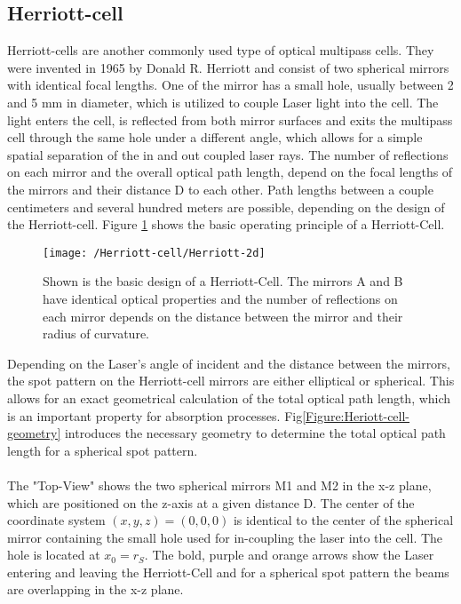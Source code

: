 \subsection{Herriott-cell}
Herriott-cells are another commonly used type of optical multipass cells. They were invented in 1965 by Donald R. Herriott and consist of two spherical mirrors with identical focal lengths. One of the mirror has a small hole, usually between 2 and 5 mm in diameter, which is utilized to couple Laser light into the cell. The light enters the cell, is reflected from both mirror surfaces and exits the multipass cell through the same hole under a different angle, which allows for a simple spatial separation of the in and out coupled laser rays. The number of reflections on each mirror and the overall optical path length, depend on the focal lengths of the mirrors and their distance D to each other. Path lengths between a couple centimeters and several hundred meters are possible, depending on the design of the Herriott-cell. Figure \ref{Figure:Heriott-cell} shows the basic operating principle of a Herriott-Cell.
\begin{figure}[H]
	\centering
		\centering
		\texttt{[image: /Herriott-cell/Herriott-2d]}
		\caption{Shown is the basic design of a Herriott-Cell. The mirrors A and B have identical optical properties and the number of reflections on each mirror depends on the distance between the mirror and their radius of curvature.}
	\label{Figure:Heriott-cell}
\end{figure}
\noindent
Depending on the Laser's angle of incident and the distance between the mirrors, the spot pattern on the Herriott-cell mirrors are either elliptical or spherical. This allows for an exact geometrical calculation of the total optical path length, which is an important property for absorption processes. Fig\ref{Figure:Heriott-cell-geometry} introduces the necessary geometry to determine the total optical path length for a spherical spot pattern. \\\\
The "Top-View" shows the two spherical mirrors M1 and M2 in the x-z plane, which are positioned on the z-axis at a given distance D. The center of the coordinate system $(x,y,z) = (0,0,0)$ is identical to the center of the spherical mirror containing the small hole used for in-coupling the laser into the cell. The hole is located at $x_0=r_S$. The bold, purple and orange arrows show the Laser entering and leaving the Herriott-Cell and for a spherical spot pattern the beams are overlapping in the x-z plane. \\\\
